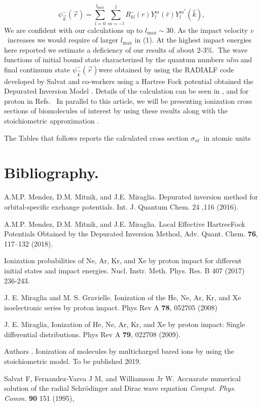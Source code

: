 \documentclass[preprint,showpacs,pra]{revtex4}
\begin{document}
\begin{equation}
\psi _{\overrightarrow{k}}^{-}(\overrightarrow{r})=\sum_{l=0}^{l_{\max
}}\sum_{m=-l}^{l}R_{kl}^{-}(r)Y_{l}^{m}(\widehat{r})Y_{l}^{m^{\ast }}(%
\widehat{k}),  \label{2}
\end{equation}%
We are confident with our calculations up to $l_{\max }\sim 30.$ As the
impact velocity $v$\ increases we would require of larger $l_{\max }$ in (1)$%
.$ At the highest impact energies here reported we estimate a deficiency of
our results of about 2-3\%.\ The wave functions of initial bound state
characterized by the quantum numbers $nlm\ $and final continuum state $\psi
_{\overrightarrow{k}}^{-}(\overrightarrow{r})$were obtained by using the
RADIALF code developed by Salvat and co-workers using a Hartree Fock
potential obtained the Depurated Inversion Model \cite{mendez2016,mendez2018}
. Details of the calculation can be seen in \cite{montanari2017}, and for
proton in Refs.\cite{miraglia2008,miraglia2009} \ In parallel to this
article, we will be presenting ionization cross sections of biomolecules of
interest by using these results along with the stoichiometric
approximation \cite{miraglia2019}.

The Tables that follows reports the calculated cross section $\sigma _{nl}\ $%
in atomic units

\section{Bibliography.}

\begin{thebibliography}{9}
 A.M.P. Mendez, D.M. Mitnik, and J.E. Miraglia.
Depurated inversion method for orbital-specific exchange potentials. Int. J.
Quantum Chem. 24 ,116 (2016).

 A.M.P. Mendez, D.M. Mitnik, and J.E. Miraglia. 
Local Effective HartreeFock Potentials Obtained by the Depurated Inversion Method,
Adv. Quant. Chem. \textbf{76}, 117--132 (2018).

 Ionization probabilities of Ne, Ar, Kr, and Xe by
proton impact for different initial states and impact energies. Nucl. Instr.
Meth. Phys. Res. B 407 (2017) 236-243.

 J. E. Miraglia and M. S. Gravielle. Ionization of the
He, Ne, Ar, Kr, and Xe isoelectronic series by proton impact. Phys Rev A 
\textbf{78}, 052705 (2008)

 J. E. Miraglia, Ionization of He, Ne, Ar, Kr, and Xe
by proton impact: Single differential distributions. Phys Rev A \textbf{79},
022708 (2009).

 Authors . Ionization of molecules by multicharged
bared ions by using the stoichiometric model. To be published 2019.

 Salvat F, Fernandez-Varea J M, and Williamson Jr W.
Accuarate numerical solution of the radial Schr\"{o}dinger and Dirac wave
equation \textit{Comput. Phys. Comm.} \textbf{90} 151 (1995),
\end{thebibliography}
\end{document}
